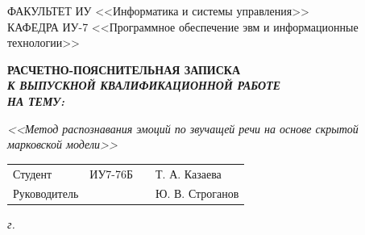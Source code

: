 \begin{titlepage}
	{
		\small \raggedright
		ФАКУЛЬТЕТ ИУ <<Информатика и системы управления>> \\
		\vspace{3.3mm}
		КАФЕДРА ИУ-7 <<Программное обеспечение эвм и информационные технологии>> \\
	}

	\vspace{20.8mm}

	{
		\LARGE \bfseries
		РАСЧЕТНО-ПОЯСНИТЕЛЬНАЯ ЗАПИСКА \\
	}
	\vspace{5mm}
	{
		\Large \bfseries \itshape
		К ВЫПУСКНОЙ КВАЛИФИКАЦИОННОЙ РАБОТЕ \\
		\vspace{5mm}
		НА ТЕМУ: \\
	}

	{
		\Large \itshape
		<<Метод распознавания эмоций по звучащей речи на основе скрытой марковской модели>>
	}

	\vfill
	
	\begin{tabular}{p{}PPT}
		Студент &  ИУ7-76Б & \uline{} & Т. А. Казаева \\
		Руководитель & ~ &  \uline{} & Ю. В. Строганов \\
	\end{tabular}
	
	\vspace{14mm}
	
	\textit{{\the\year} г.}
	
\end{titlepage}